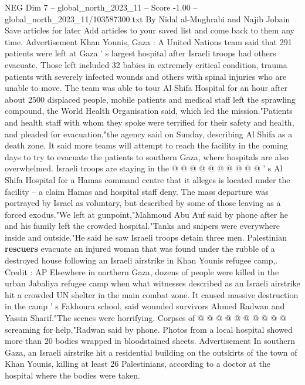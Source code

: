 \begin{textsample}{NEG Dim 7 – global\_north\_2023\_11 – Score -1.00 – global\_north\_2023\_11/103587300.txt}  \label{ex:f7_neg_328}
By Nidal al-Mughrabi and Najib Jobain Save articles for later Add articles to your saved list and come back to them any time.
Advertisement Khan Younis, Gaza : A United Nations team said that 291 patients were left at Gaza ' s largest hospital after Israeli troops had others evacuate.
Those left included 32 babies in extremely critical condition, trauma patients with severely infected wounds and others with spinal injuries who are unable to move.
The team was able to tour Al Shifa Hospital for an hour after about 2500 displaced people, mobile patients and medical staff left the sprawling compound, the World Health Organisation said, which led the mission."Patients and health staff with whom they spoke were terrified for their safety and health, and pleaded for evacuation,"the agency said on Sunday, describing Al Shifa as a death zone.
It said more teams will attempt to reach the facility in the coming days to try to evacuate the patients to southern Gaza, where hospitals are also overwhelmed.
Israeli troops are staying in the @ @ @ @ @ @ @ @ @ @ ' s Al Shifa Hospital for a Hamas command centre that it alleges is located under the facility -- a claim Hamas and hospital staff deny.
The mass departure was portrayed by Israel as voluntary, but described by some of those leaving as a forced exodus."We left at gunpoint,"Mahmoud Abu Auf said by phone after he and his family left the crowded hospital."Tanks and snipers were everywhere inside and outside."He said he saw Israeli troops detain three men.
Palestinian \textbf{rescuers} evacuate an injured woman that was found under the rubble of a destroyed house following an Israeli airstrike in Khan Younis refugee camp,.
Credit : AP Elsewhere in northern Gaza, dozens of people were killed in the urban Jabaliya refugee camp when what witnesses described as an Israeli airstrike hit a crowded UN shelter in the main combat zone.
It caused massive destruction in the camp ' s Fakhoura school, said wounded survivors Ahmed Radwan and Yassin Sharif."The scenes were horrifying.
Corpses of @ @ @ @ @ @ @ @ @ @ screaming for help,"Radwan said by phone.
Photos from a local hospital showed more than 20 bodies wrapped in bloodstained sheets.
Advertisement In southern Gaza, an Israeli airstrike hit a residential building on the outskirts of the town of Khan Younis, killing at least 26 Palestinians, according to a doctor at the hospital where the bodies were taken.

\end{textsample}
